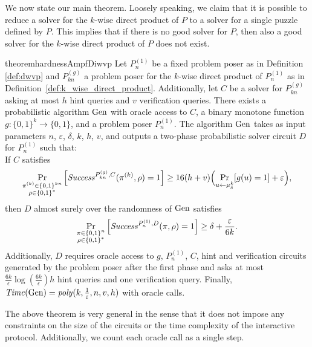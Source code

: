 We now state our main theorem. Loosely speaking, we claim that it is possible to reduce a solver for the $k$-wise direct product of $P$
to a solver for a single puzzle defined by $P$. This implies that if there is no good solver for $P$, then also a good solver for
the $k$-wise direct product of $P$ does not exist.
%
\begin{restatable}{theorem}{hardnessAmpfDiwvp}
\label{th:sec_amp_for_dwvp}
Let $P_{n}^{(1)}$ be a fixed problem poser as in Definition \ref{def:dwvp}
and $P_{kn}^{(g)}$ a problem poser for the $k$-wise direct product of $P_{n}^{(1)}$ as in Definition~\ref{def:k_wise_direct_product}.
Additionally, let $C$ be a solver for $P_{kn}^{(g)}$ asking at most $h$ hint queries and $v$ verification queries.
There exists a probabilistic algorithm $\operatorname{\text{Gen}}$ with oracle access to $C$,
a binary monotone function $g:\{0,1\}^k \rightarrow \{0,1\}$, and a problem poser $P_{n}^{(1)}$.
The algorithm $\operatorname{\text{Gen}}$ takes as input parameters $n$, $\varepsilon$, $\delta$, $k$, $h$, $v$,
and outputs a two-phase probabilistic solver circuit $D$ for $P_{n}^{(1)}$ such that: \\
If $C$ satisfies
  \begin{align}
    \label{th_sec_amp_dwvp_assum}
    \underset{\substack{\pi^{(k)} \in \{0,1\}^{kn} \\ \rho \in \{0,1\}^{*}}}{\Pr}\left[\mathit{Success}^{P_{kn}^{(g)}, C}(\pi^{(k)}, \rho) = 1\right]
    \geq 16(h+v)\Bigl(\underset{u \leftarrow \mu_\delta^k}{\Pr}[g(u) = 1] + \varepsilon \Bigr),
  \end{align}
then $D$ almost surely over the randomness of $\operatorname{\text{Gen}}$ satisfies
  \begin{align}
    \underset{\substack{\pi \in \{0,1\}^{n} \\ \rho \in \{0,1\}^{*}}}
    {\Pr}\left[\operatorname{\mathit{Success}}^{P_{n}^{(1)},D}(\pi, \rho) = 1\right] \geq \delta + \frac{\varepsilon}{6k}.
  \end{align}
Additionally, $D$ requires oracle access to $g$, $P_{n}^{(1)}$, $C$, hint and verification circuits generated by
the problem poser after the first phase and asks at most $\frac{6k}{\epsilon}\log\left(\frac{6k}{\epsilon}\right) h$
hint queries and one verification query. Finally, $\operatorname{\mathit{Time}}(\operatorname{\text{Gen}}) = \operatorname{\mathit{poly}}(k, \frac{1}{\varepsilon}, n, v, h)$ with oracle calls.
\end{restatable}

The above theorem is very general in the sense that it does not impose any constraints
on the size of the circuits or the time complexity of the interactive protocol.
Additionally, we count each oracle call as a single step.

